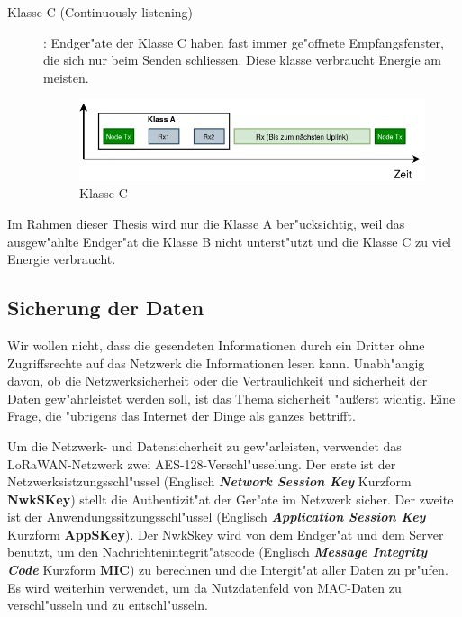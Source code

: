 \begin{description}
	\item [Klasse C (Continuously listening)]: Endger"ate der Klasse C haben fast immer ge"offnete Empfangsfenster, die sich nur beim Senden schliessen. Diese klasse verbraucht Energie am meisten.
	
	\begin{figure}[h]
		\centering
		\includegraphics[width=13cm]{source/images/ClassC}
		\caption{Klasse C \label{fig:classC}}
	\end{figure}

\end{description}

\vspace{10cm}
Im Rahmen dieser Thesis wird nur die Klasse A ber"ucksichtig, weil das ausgew"ahlte Endger"at die Klasse B nicht unterst"utzt und die Klasse C zu viel Energie verbraucht. 

\subsection{Sicherung der Daten}

Wir wollen nicht, dass die gesendeten Informationen durch ein Dritter ohne Zugriffsrechte auf das Netzwerk die Informationen lesen kann. Unabh"angig davon, ob die Netzwerksicherheit oder die Vertraulichkeit und sicherheit der Daten gew"ahrleistet werden soll, ist das Thema sicherheit "au\ss{}erst wichtig. Eine Frage, die "ubrigens das Internet der Dinge als ganzes bettrifft.

Um die Netzwerk- und Datensicherheit zu gew"arleisten, verwendet das LoRaWAN-Netzwerk zwei AES-128-Verschl"usselung. Der erste ist der Netzwerksistzungsschl"ussel (Englisch \textbf{\textit{Network Session Key}} Kurzform \textbf{NwkSKey}) stellt die Authentizit"at der Ger"ate im Netzwerk sicher. Der zweite ist der Anwendungssitzungsschl"ussel
(Englisch \textbf{\textit{Application Session Key}} Kurzform \textbf{AppSKey}). Der NwkSkey wird von dem Endger"at und dem Server benutzt, um den Nachrichtenintegrit"atscode (Englisch \textbf{\textit{Message Integrity Code}} Kurzform \textbf{MIC}) zu berechnen und die Intergit"at aller Daten zu pr"ufen.  Es wird weiterhin verwendet, um da  Nutzdatenfeld von MAC-Daten zu verschl"usseln und zu entschl"usseln. 

